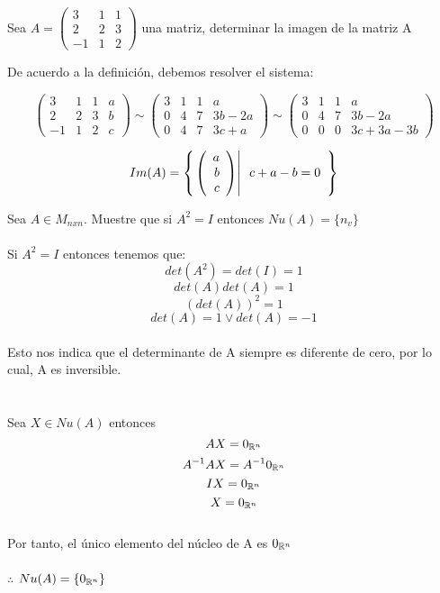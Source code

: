 \begin{ejemplo}
Sea $A=
\left(
\begin{array}{rrr}
3&1&1\\
2&2&3\\
-1&1&2
\end{array}
\right)$ una matriz, determinar la imagen de la matriz A
 
De acuerdo a la definición, debemos resolver el sistema:

\[
\left(
\begin{array}{rrr|r}
3&1&1&a\\
2&2&3&b\\
-1&1&2&c
\end{array}
\right)
\sim
\left(
\begin{array}{rrr|r}
3&1&1&a\\
0&4&7&3b-2a\\
0&4&7&3c+a
\end{array}
\right)
\sim
\left(
\begin{array}{rrr|r}
3&1&1&a\\
0&4&7&3b-2a\\
0&0&0&3c+3a-3b
\end{array}
\right)
\]

\[Im(A)=\left\{ \left. \left( \begin{array}{r} a\\ b\\ c \end{array} \right) \right| \begin{array}{r}
c+a-b=0\\
\end{array} \right\}
\]

\end{ejemplo}

\begin{ejercicio}

Sea $A \in M_{nxn} $. Muestre que si $A^2=I$ entonces $Nu(A)=\{n_v\}$
~\\
\sol
~\\
Si $A^2=I$  entonces tenemos que:~\\
\[det(A^2)=det(I)=1\]
\[det(A)det(A)=1\]
\[(det(A))^2=1\]
\[det(A)=1 \vee det(A)=-1\]
~\\
Esto nos indica que el determinante de A siempre es diferente de cero, por lo cual, A es inversible.~\\
~\\
~\\
Sea $X\in Nu(A)$ entonces 
\[AX=0_{\mathbb{R}^n}\]
\[A^{-1}AX=A^{-1} 0_{\mathbb{R}^n}\]
\[IX=0_{\mathbb{R}^n}\]
\[X=0_{\mathbb{R}^n}\]
~\\
Por tanto, el único elemento del núcleo de A es $0_{\mathbb{R}^n}$
~\\
~\\
$\therefore$ $Nu(A)=\lbrace 0_{\mathbb{R}^n} \rbrace$

\end{ejercicio}

